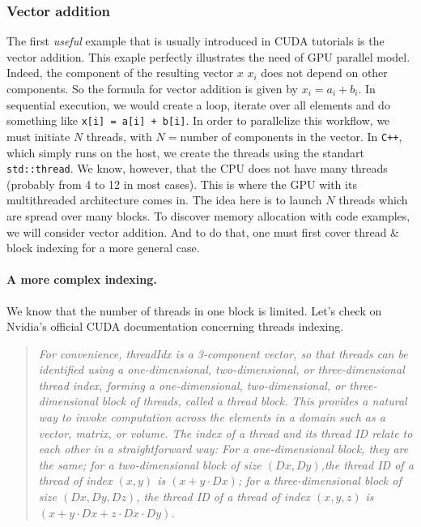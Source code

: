 \subsubsection{Vector addition}
The first \textit{useful} example 
that is usually introduced in CUDA tutorials is the vector addition. This exaple
perfectly illustrates the need of GPU parallel model. Indeed, the component of the resulting
 vector $x$ $x_i$ does not depend on other components. So the formula for vector addition is given by 
 $x_i = a_i + b_i$. In sequential execution, we would create a loop, iterate over all elements and 
do something like \verb|x[i] = a[i] + b[i]|. In order to parallelize this workflow, we must initiate $N$ 
threads, with $N = \text{number of components in the vector}$. In \verb|C++|, which simply runs on the host, we create the threads 
using the standart \verb|std::thread|. We know, however, that the CPU does not have many threads (probably from 4 to 12 in most cases). 
This is where the GPU with its multithreaded architecture comes in. The idea here is to launch $N$ threads which are spread over many blocks.
\newline 
To discover memory allocation with code examples, we will consider vector addition. And to do that, 
one must first cover thread \& block indexing for a more general case.

\paragraph{A more complex indexing.} 
We know that the number of threads in one 
block is limited. Let's check on Nvidia's official CUDA documentation \cite{center} concerning threads indexing. 
\begin{quote}
   \textsl{For convenience, {\selectfont threadIdx} is a 3-component vector, 
   so that threads can be identified using a one-dimensional, 
   two-dimensional, or three-dimensional thread index, forming a one-dimensional, two-dimensional, 
   or three-dimensional block of threads, called a thread block. This provides a natural way to invoke computation across 
   the elements in a domain such as a vector, matrix, or volume.
   The index of a thread and its thread ID relate to each other 
   in a straightforward way: For a one-dimensional block, they are the same; for 
   a two-dimensional block of size $(Dx, Dy)$,the thread ID of a thread 
   of index $(x, y)$ is $(x + y\cdot Dx)$; for a three-dimensional block of size $(Dx, Dy, Dz)$, the thread ID of a 
   thread of index $(x, y, z)$ is $(x + y\cdot Dx + z\cdot Dx\cdot Dy)$.}
\end{quote}

